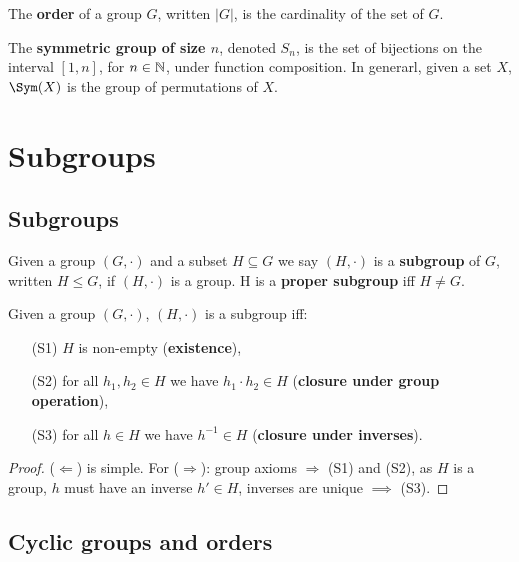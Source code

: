\documentclass[../Year1.tex]{subfiles}
\begin{document}
\begin{definition}
    The \textbf{order} of a group $G$, written $|G|$, is the cardinality of the set of $G$.
\end{definition}

\begin{example}
    The \textbf{symmetric group of size $n$}, denoted $S_n$, is the set of bijections on the interval $[1,n]$, for $n\in\mathbb{N}$, under function composition. In generarl, given a set $X$, $\Sym(X)$ is the group of permutations of $X$.
\end{example}

\section{Subgroups}

\subsection{Subgroups}

\begin{definition}[Subgroup]
    Given a group $(G,\cdot)$ and a subset $H\subseteq G$ we say $(H,\cdot)$ is a \textbf{subgroup} of $G$, written $H\leq G$, if $(H,\cdot)$ is a group. H is a \textbf{proper subgroup} iff $H\neq G$.
\end{definition}

\begin{theorem}
    Given a group $(G,\cdot)$, $(H,\cdot)$ is a subgroup iff: \begin{enumerate}
        \item[(S1)] $H$ is non-empty (\textbf{existence}),
        \item[(S2)] for all $h_1,h_2\in H$ we have $h_1\cdot h_2\in H$ (\textbf{closure under group operation}),
        \item[(S3)] for all $h\in H$ we have $h^{-1}\in H$ (\textbf{closure under inverses}).
    \end{enumerate}
\end{theorem}
 
\begin{proof}
    ($\Leftarrow$) is simple. For ($\Rightarrow$): group axioms $\Rightarrow$ (S1) and (S2), as $H$ is a group, $h$ must have an inverse $h'\in H$, inverses are unique $\implies$ (S3).
\end{proof}

\subsection{Cyclic groups and orders}
\end{document}
